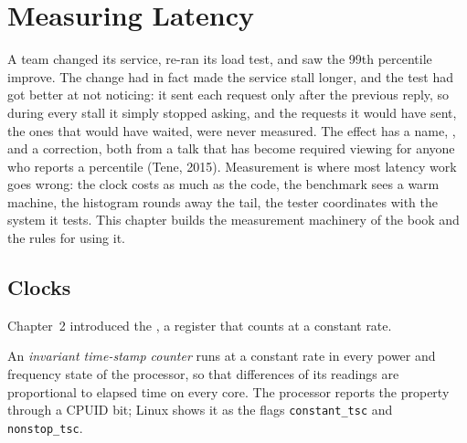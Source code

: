 \chapter{Measuring Latency}\label{ch:ll:measuring-latency}

A team changed its service, re-ran its load test, and saw the 99th percentile improve. The change had in fact made the
service stall longer, and the test had got better at not noticing: it sent each request only after the previous reply,
so during every stall it simply stopped asking, and the requests it would have sent, the ones that would have waited,
were never measured. The effect has a name, , and a correction, both from a talk that has become
required viewing for anyone who reports a percentile (Tene, 2015). Measurement is where most latency work goes wrong: the
clock costs as much as the code, the benchmark sees a warm machine, the histogram rounds away the tail, the tester
coordinates with the system it tests. This chapter builds the measurement machinery of the book and the rules for using
it.

\section{Clocks}

Chapter~2 introduced the , a register that counts at a constant rate.

\begin{definition}\label{def:ll:measuring-latency:invtsc}
An \emph{invariant time-stamp counter} runs at a constant rate in every power and
frequency state of the processor, so that differences of its readings are proportional to elapsed time on every core.
The processor reports the property through a CPUID bit; Linux shows it as the flags \texttt{constant\_tsc} and
\texttt{nonstop\_tsc}.
\end{definition}

